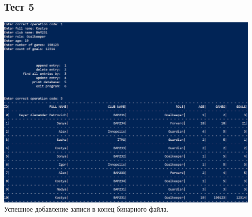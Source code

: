 \documentclass[12pt]{article}
\begin{document}
	\subsection{Тест 5}
	\includegraphics[width=1\linewidth]{test_5.png} \newline
	Успешное добавление записи в конец бинарного файла.
	
\end{document}
